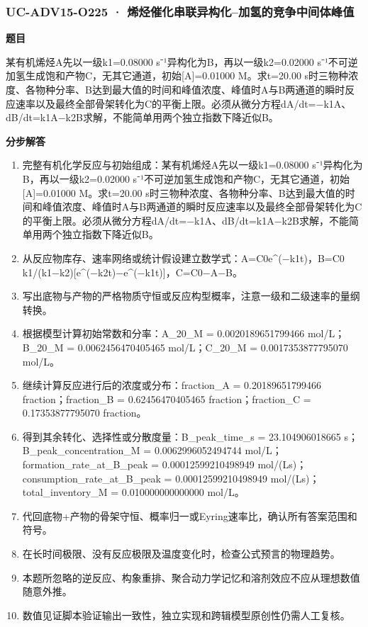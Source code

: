 \documentclass[UTF8,11pt,a4paper]{ctexart}
\begin{document}
\subsubsection*{UC-ADV15-O225 · 烯烃催化串联异构化–加氢的竞争中间体峰值}
\noindent\textbf{题目}\par
某有机烯烃A先以一级k1=0.08000 s⁻¹异构化为B，再以一级k2=0.02000 s⁻¹不可逆加氢生成饱和产物C，无其它通道，初始[A]=0.01000 M。求t=20.00 s时三物种浓度、各物种分率、B达到最大值的时间和峰值浓度、峰值时A与B两通道的瞬时反应速率以及最终全部骨架转化为C的平衡上限。必须从微分方程dA/dt=−k1A、dB/dt=k1A−k2B求解，不能简单用两个独立指数下降近似B。\par
\medskip\noindent\textbf{分步解答}
\begin{enumerate}
\item 完整有机化学反应与初始组成：某有机烯烃A先以一级k1=0.08000 s⁻¹异构化为B，再以一级k2=0.02000 s⁻¹不可逆加氢生成饱和产物C，无其它通道，初始[A]=0.01000 M。求t=20.00 s时三物种浓度、各物种分率、B达到最大值的时间和峰值浓度、峰值时A与B两通道的瞬时反应速率以及最终全部骨架转化为C的平衡上限。必须从微分方程dA/dt=−k1A、dB/dt=k1A−k2B求解，不能简单用两个独立指数下降近似B。
\item 从反应物库存、速率网络或统计假设建立数学式：A=C0e\textasciicircum{}(−k1t)，B=C0 k1/(k1−k2)[e\textasciicircum{}(−k2t)−e\textasciicircum{}(−k1t)]，C=C0−A−B。
\item 写出底物与产物的严格物质守恒或反应构型概率，注意一级和二级速率的量纲转换。
\item 根据模型计算初始常数和分率：A\_20\_M = 0.0020189651799466 mol/L；B\_20\_M = 0.0062456470405465 mol/L；C\_20\_M = 0.0017353877795070 mol/L。
\item 继续计算反应进行后的浓度或分布：fraction\_A = 0.20189651799466 fraction；fraction\_B = 0.62456470405465 fraction；fraction\_C = 0.17353877795070 fraction。
\item 得到其余转化、选择性或分散度量：B\_peak\_time\_s = 23.104906018665 s；B\_peak\_concentration\_M = 0.0062996052494744 mol/L；formation\_rate\_at\_B\_peak = 0.00012599210498949 mol/(Ls)；consumption\_rate\_at\_B\_peak = 0.00012599210498949 mol/(Ls)；total\_inventory\_M = 0.010000000000000 mol/L。
\item 代回底物+产物的骨架守恒、概率归一或Eyring速率比，确认所有答案范围和符号。
\item 在长时间极限、没有反应极限及温度变化时，检查公式预言的物理趋势。
\item 本题所忽略的逆反应、构象重排、聚合动力学记忆和溶剂效应不应从理想数值随意外推。
\item 数值见证脚本验证输出一致性，独立实现和跨辑模型原创性仍需人工复核。
\end{enumerate}
\end{document}
